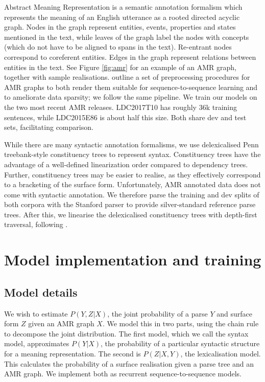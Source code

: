 Abstract Meaning Representation is a semantic annotation formalism which represents the meaning of an English utterance as a rooted directed acyclic graph. Nodes in the graph represent entities, events, properties and states mentioned in the text, while leaves of the graph label the nodes with concepts (which do not have to be aligned to spans in the text). Re-entrant nodes correspond to coreferent entities. Edges in the graph represent relations between entities in the text. See Figure \ref{fig:amr} for an example of an AMR graph, together with sample realisations. \citet{Konstas:17} outline a set of preprocessing procedures for AMR graphs to both render them suitable for sequence-to-sequence learning and to ameliorate data sparsity; we follow the same pipeline. We train our models on the two most recent AMR releases. LDC2017T10 has roughly 36k training sentences, while LDC2015E86 is about half this size. Both share dev and test sets, facilitating comparison.

While there are many syntactic annotation formalisms, we use delexicalised Penn treebank-style constituency trees to represent syntax. Constituency trees have the advantage of a well-defined linearization order compared to dependency trees. Further, constituency trees may be easier to realise, as they effectively correspond to a bracketing of the surface form. Unfortunately, AMR annotated data does not come with syntactic annotation. We therefore parse the training and dev splits of both corpora with the Stanford parser \citep{Manning:14} to provide silver-standard reference parse trees. After this, we linearise the delexicalised constituency trees with depth-first traversal, following \citet{Vinyals:15}.

\section{Model implementation and training}

\subsection{Model details}
We wish to estimate $P(Y, Z|X)$, the joint probability of a parse $Y$ and surface form $Z$ given an AMR graph $X$. We model this in two parts, using the chain rule to decompose the joint distribution. The first model, which we call the syntax model, approximates $P(Y|X)$, the probability of a particular syntactic structure for a meaning representation. The second is $P(Z|X, Y)$, the lexicalisation model. This calculates the probability of a surface realisation given a parse tree and an AMR graph. We implement both as recurrent sequence-to-sequence models.

